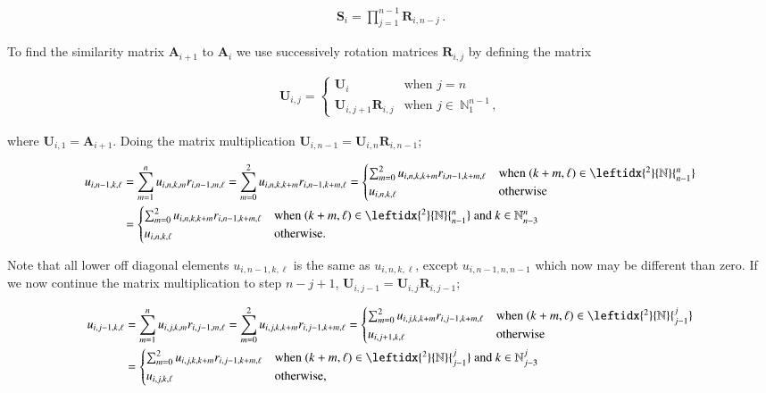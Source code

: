 \documentclass[11pt,english,a4paper]{article}
\begin{document}
\begin{flushleft}
\begin{align*}
\textbf{S}_i = \prod_{j=1}^{n-1} \textbf{R}_{i,n-j} \,.
\end{align*}

To find the similarity matrix $\textbf{A}_{i+1}$ to $\textbf{A}_i$ we use successively rotation matrices $\textbf{R}_{i,j}$ by defining the matrix

\begin{align*}
\textbf{U}_{i,j} = \begin{cases} \textbf{U}_i & \text{when } j = n \\ \textbf{U}_{i,j+1}\textbf{R}_{i,j} & \text{when } j\in \ \mathbb{N}_1^{n-1}\,, \end{cases}
\end{align*}

where $\textbf{U}_{i,1} = \textbf{A}_{i+1}$. Doing the matrix multiplication $\textbf{U}_{i,n-1} = \textbf{U}_{i,n} \textbf{R}_{i,n-1}$;

\begin{align*}
u_{i,n-1,k,\ell} &= \sum_{m=1}^n u_{i,n,k,m} r_{i,n-1,m,\ell} = \sum_{m=0}^2 u_{i,n,k,k+m} r_{i,n-1,k+m,\ell} 
= \begin{cases} \sum_{m=0}^2 u_{i,n,k,k+m} r_{i,n-1,k+m,\ell} & \text{when } (k+m,\ell)\in{\leftidx{^2}{\mathbb{N}}{_{n-1}^n}} \\ u_{i,n,k,\ell} & \text{otherwise} \end{cases}
\\
&= \begin{cases} \sum_{m=0}^2 u_{i,n,k,k+m} r_{i,n-1,k+m,\ell} & \text{when } (k+m,\ell)\in{\leftidx{^2}{\mathbb{N}}{_{n-1}^n}} \text{ and } k\in\mathbb{N}_{n-3}^n  \\ u_{i,n,k,\ell} & \text{otherwise.} \end{cases}
\end{align*} 

Note that all lower off diagonal elements $u_{i,n-1,k,\ell}$ is the same as $u_{i,n,k,\ell}$, except $u_{i,n-1,n,n-1}$ which now may be different than zero. If we now continue the matrix multiplication to step $n-j+1$, $\textbf{U}_{i,j-1} = \textbf{U}_{i,j}\textbf{R}_{i,j-1}$;

\begin{align*}
u_{i,j-1,k,\ell} &= \sum_{m=1}^n u_{i,j,k,m} r_{i,j-1,m,\ell} = \sum_{m=0}^2 u_{i,j,k,k+m} r_{i,j-1,k+m,\ell} 
= \begin{cases} \sum_{m=0}^2 u_{i,j,k,k+m} r_{i,j-1,k+m,\ell} & \text{when } (k+m,\ell)\in{\leftidx{^2}{\mathbb{N}}{_{j-1}^{j}}} \\ u_{i,j+1,k,\ell} & \text{otherwise} \end{cases}
\\
&= \begin{cases} \sum_{m=0}^2 u_{i,j,k,k+m} r_{i,j-1,k+m,\ell} & \text{when } (k+m,\ell)\in{\leftidx{^2}{\mathbb{N}}{_{j-1}^{j}}} \text{ and } k\in\mathbb{N}_{j-3}^{j}  \\ u_{i,j,k,\ell} & \text{otherwise,} \end{cases}
\end{align*}


\end{flushleft}
\end{document}
